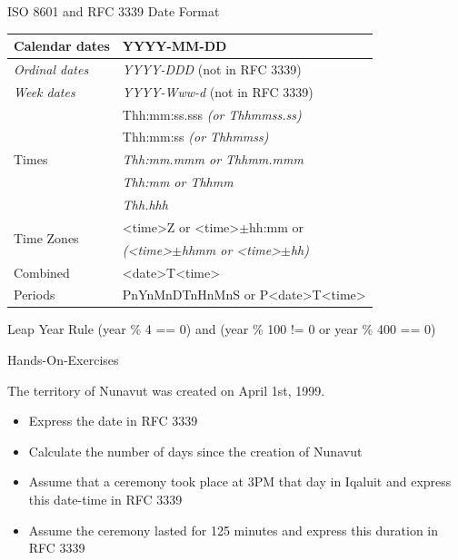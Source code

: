 \documentclass[ignorenonframetext,xcolor=x11names]{beamer}
\begin{document}
\begin{frame}{ISO 8601 and RFC 3339 Date Format} 
\footnotesize
\renewcommand{\arraystretch}{1.25}

\begin{tabular}{l|l} \hline
	Calendar dates & YYYY-MM-DD  \\ \hline
	\textit{Ordinal dates} & \textit{YYYY-DDD} (not in RFC 3339) \\ \hline
	\textit{Week dates} & \textit{YYYY-Www-d} (not in RFC 3339) \\ \hline
	\multirow{5}{*}{Times} & Thh:mm:ss.sss \textit{(or Thhmmss.ss)} \\
	& Thh:mm:ss \textit{(or Thhmmss)} \\
	& \textit{Thh:mm.mmm or Thhmm.mmm} \\
	& \textit{Thh:mm or Thhmm} \\
	& \textit{Thh.hhh} \\ \hline
	\multirow{2}{*}{Time Zones} & <time>Z or <time>$\pm$hh:mm or \\
	& \textit{(<time>$\pm$hhmm or <time>$\pm$hh)} \\ \hline
	Combined & <date>T<time> \\
	Periods & PnYnMnDTnHnMnS or P<date>T<time>
\end{tabular}
\begin{block}{Leap Year Rule}
(year \% 4 == 0) and (year \% 100 != 0 or year \% 400 == 0)
\end{block}
\end{frame}

\begin{frame}{Hands-On-Exercises}

\begin{tcolorbox}[colback=code]
The territory of Nunavut was created on April 1st, 1999.
\end{tcolorbox}

\begin{itemize}
	\item Express the date in RFC 3339
	\item Calculate the number of days since the creation of Nunavut
	\item Assume that a ceremony took place at 3PM that day in Iqaluit and express this date-time in RFC 3339
	\item Assume the ceremony lasted for 125 minutes and express this duration in RFC 3339
\end{itemize}
\end{frame}
\end{document}
